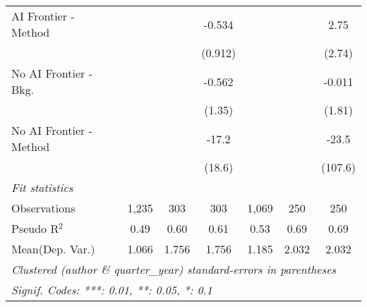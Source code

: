 \begin{tabular}{lcccccc}
   AI Frontier - Method    &               &         & -0.534      &               &         & 2.75\\   
                           &               &         & (0.912)     &               &         & (2.74)\\   
   No AI Frontier - Bkg.   &               &         & -0.562      &               &         & -0.011\\   
                           &               &         & (1.35)      &               &         & (1.81)\\   
   No AI Frontier - Method &               &         & -17.2       &               &         & -23.5\\   
                           &               &         & (18.6)      &               &         & (107.6)\\   
   \midrule
   \emph{Fit statistics}\\
   Observations            & 1,235         & 303     & 303         & 1,069         & 250     & 250\\  
   Pseudo R$^2$            & 0.49          & 0.60    & 0.61        & 0.53          & 0.69    & 0.69\\  
Mean(Dep. Var.) & 1.066 & 1.756 & 1.756 & 1.185 & 2.032 & 2.032 \\
   \midrule \midrule
   \multicolumn{7}{l}{\emph{Clustered (author \& quarter\_year) standard-errors in parentheses}}\\
   \multicolumn{7}{l}{\emph{Signif. Codes: ***: 0.01, **: 0.05, *: 0.1}}\\
\end{tabular}
\par\endgroup
